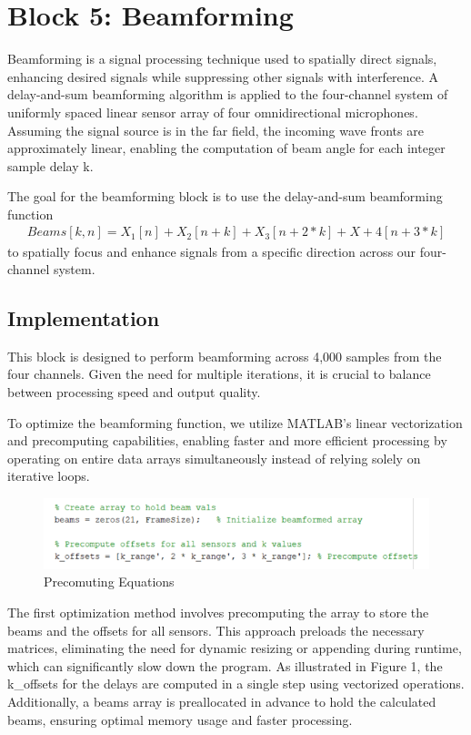 
\section{Block 5: Beamforming}

Beamforming is a signal processing technique used to spatially direct signals, enhancing desired signals while suppressing other signals with interference. A delay-and-sum beamforming algorithm is applied to the four-channel system of uniformly spaced linear sensor array of four omnidirectional microphones. Assuming the signal source is in the far field, the incoming wave fronts are approximately linear, enabling the computation of beam angle for each integer sample delay k.

The goal for the beamforming block is to use the delay-and-sum beamforming function 
\begin{align*}
    Beams[k,n] = X_1[n]+X_2[n+k]+X_3[n+2*k]+X+4[n+3*k]
\end{align*}
to spatially focus and enhance signals from a specific direction across our four-channel system.


\subsection{Implementation}

This block is designed to perform beamforming across 4,000 samples from the four channels. Given the need for multiple iterations, it is crucial to balance between processing speed and output quality.

To optimize the beamforming function, we utilize \textsc{MATLAB}'s linear vectorization and precomputing capabilities, enabling faster and more efficient processing by operating on entire data arrays simultaneously instead of relying solely on iterative loops.

\begin{figure}[H]
    \centering
    \includegraphics[width=0.5\linewidth]{figures/beamform_fig1.png}
    \caption{Precomuting Equations}
    \label{fig:precomputing_equations}
\end{figure}

The first optimization method involves precomputing the array to store the beams and the offsets for all sensors. This approach preloads the necessary matrices, eliminating the need for dynamic resizing or appending during runtime, which can significantly slow down the program. As illustrated in Figure 1, the k\_offsets for the delays are computed in a single step using vectorized operations. Additionally, a beams array is preallocated in advance to hold the calculated beams, ensuring optimal memory usage and faster processing.

